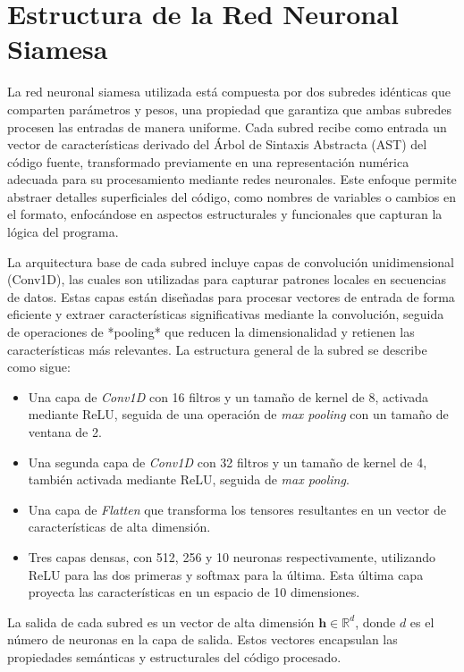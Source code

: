 \section{Estructura de la Red Neuronal Siamesa}

La red neuronal siamesa utilizada está compuesta por dos subredes idénticas que comparten parámetros y pesos, una propiedad que garantiza que ambas subredes procesen las entradas de manera uniforme. Cada subred recibe como entrada un vector de características derivado del Árbol de Sintaxis Abstracta (AST) del código fuente, transformado previamente en una representación numérica adecuada para su procesamiento mediante redes neuronales. Este enfoque permite abstraer detalles superficiales del código, como nombres de variables o cambios en el formato, enfocándose en aspectos estructurales y funcionales que capturan la lógica del programa.

La arquitectura base de cada subred incluye capas de convolución unidimensional (Conv1D), las cuales son  utilizadas para capturar patrones locales en secuencias de datos. Estas capas están diseñadas para procesar vectores de entrada de forma eficiente y extraer características significativas mediante la convolución, seguida de operaciones de *pooling* que reducen la dimensionalidad y retienen las características más relevantes. La estructura general de la subred se describe como sigue:

\begin{itemize}
    \item Una capa de \textit{Conv1D} con 16 filtros y un tamaño de kernel de 8, activada mediante ReLU, seguida de una operación de \textit{max pooling} con un tamaño de ventana de 2.
    \item Una segunda capa de \textit{Conv1D} con 32 filtros y un tamaño de kernel de 4, también activada mediante ReLU, seguida de \textit{max pooling}.
    \item Una capa de \textit{Flatten} que transforma los tensores resultantes en un vector de características de alta dimensión.
    \item Tres capas densas, con 512, 256 y 10 neuronas respectivamente, utilizando ReLU para las dos primeras y softmax para la última. Esta última capa proyecta las características en un espacio de 10 dimensiones.
\end{itemize}

La salida de cada subred es un vector de alta dimensión \( \mathbf{h} \in \mathbb{R}^d \), donde \( d \) es el número de neuronas en la capa de salida. Estos vectores encapsulan las propiedades semánticas y estructurales del código procesado.

